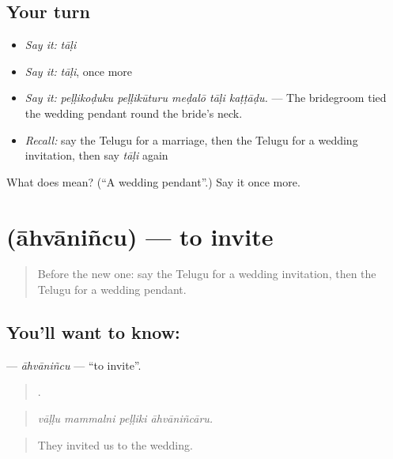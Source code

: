 \subsection*{Your turn}
\begin{itemize}
\raggedright
  \item \emph{Say it:} \emph{tāḷi}
  \item \emph{Say it:} \emph{tāḷi}, once more
  \item \emph{Say it:} \emph{peḷḷikoḍuku peḷḷikūturu meḍalō tāḷi kaṭṭāḍu.} — The bridegroom tied the wedding pendant round the bride's neck.
  \item \emph{Recall:} say the Telugu for a marriage, then the Telugu for a wedding invitation, then say \emph{tāḷi} again
\end{itemize}

\begin{tcolorbox}[breakable,colback=teal!4,colframe=teal!35!black,title={Before you move on}]
What does  mean? (\textquotedblleft{}A wedding pendant\textquotedblright{}.) Say it once more.
\end{tcolorbox}
\section[\texorpdfstring{\te{ఆహ్వానించు} (āhvāniñcu)}{ఆహ్వానించు (āhvāniñcu)}]{ (āhvāniñcu) — to invite}

\label{lesson:TE-C346-ahvanincu}



\begin{quote}
Before the new one: say the Telugu for a wedding invitation, then the Telugu for a wedding pendant.
\end{quote}

\subsection*{You'll want to know: }
\textbf{} — \emph{āhvāniñcu} — \textquotedblleft{}to invite\textquotedblright{}.

\begin{quote}
   .
\end{quote}

\begin{quote}
\emph{vāḷḷu mammalni peḷḷiki āhvāniñcāru.}
\end{quote}

\begin{quote}
They invited us to the wedding.
\end{quote}

